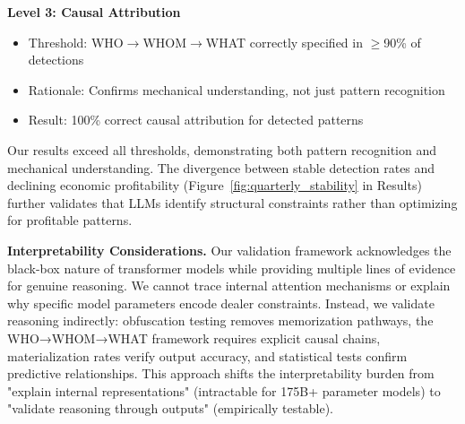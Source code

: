 \textbf{Level 3: Causal Attribution}
\begin{itemize}
\item Threshold: WHO$\rightarrow$WHOM$\rightarrow$WHAT correctly specified in $\geq$90\% of detections
\item Rationale: Confirms mechanical understanding, not just pattern recognition
\item Result: 100\% correct causal attribution for detected patterns
\end{itemize}

Our results exceed all thresholds, demonstrating both pattern recognition and mechanical understanding. The divergence between stable detection rates and declining economic profitability (Figure~\ref{fig:quarterly_stability} in Results) further validates that LLMs identify structural constraints rather than optimizing for profitable patterns.

\textbf{Interpretability Considerations.} Our validation framework acknowledges the black-box nature of transformer models while providing multiple lines of evidence for genuine reasoning. We cannot trace internal attention mechanisms or explain why specific model parameters encode dealer constraints. Instead, we validate reasoning indirectly: obfuscation testing removes memorization pathways, the WHO→WHOM→WHAT framework requires explicit causal chains, materialization rates verify output accuracy, and statistical tests confirm predictive relationships. This approach shifts the interpretability burden from "explain internal representations" (intractable for 175B+ parameter models) to "validate reasoning through outputs" (empirically testable).